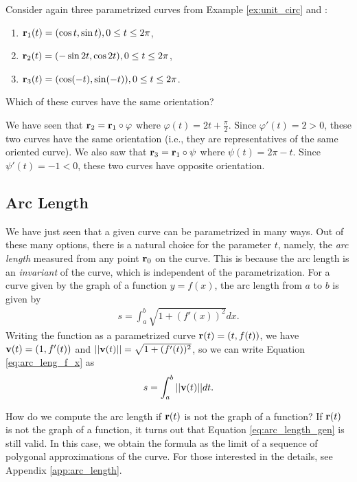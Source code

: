 \documentclass[12pt,letterpaper,reqno]{article}
\numberwithin{equation}{section}
\newcommand{\bv}{{\bf v}}
\newcommand{\bbr}{{\bf r}}
\begin{document}
{\begin{exercise}
Consider again three parametrized curves from Example \ref{ex:unit_circ} and :
\begin{enumerate}[(1)]
	\item $\bbr_1(t)=(\cos t, \sin t), 0 \leq t \leq 2\pi$, 
	\item $\bbr_2(t)=(-\sin 2t, \cos 2t), 0 \leq t \leq 2\pi$,
	\item $\bbr_3(t)=(\cos(-t), \sin(-t)), 0 \leq t \leq 2\pi$.
\end{enumerate}	
Which of these curves have the same orientation?
\end{exercise}

{\color{red}
\begin{solution}
	We have seen that $\bbr_2=\bbr_1 \circ \varphi$ where $\varphi(t)=2t+\frac{\pi}{2}$. Since $\varphi'(t)=2>0$, these two curves have the same orientation (i.e., they are representatives of the same oriented curve). We also saw that $\bbr_3=\bbr_1 \circ \psi$ where $\psi(t)=2\pi-t$. Since $\psi'(t)=-1<0$, these two curves have opposite orientation.
\end{solution}
}

\subsection{Arc Length}
We have just seen that a given curve can be parametrized in many ways. Out of these many options, there is a natural choice for the parameter $t$, namely, the \emph{arc length} measured from any point $\bbr_0$ on the curve. This is because the arc length is an \emph{invariant} of the curve, which is independent of the parametrization. For a curve given by the graph of a function $y=f(x)$, the arc length from $a$ to $b$ is given by
\begin{align}\label{eq:arc_leng_f_x}
	s=\int_a^b\sqrt{1+(f'(x))^2}dx.
\end{align}
Writing the function as a parametrized curve $\bbr(t)=(t,f(t))$, we have $\bv(t)=(1,f'(t))$ and $||\bv(t)||=\sqrt{1+(f'(t))^2}$, so we can write Equation \eqref{eq:arc_leng_f_x} as
\begin{align}\label{eq:arc_length_gen}
	s=\int_a^b||\bv(t)||dt.
\end{align}

How do we compute the arc length if $\bbr(t)$ is not the graph of a function?  If $\bbr(t)$ is not the graph of a function, it turns out that Equation \eqref{eq:arc_length_gen} is still valid.  In this case, we obtain the formula as the limit of a sequence of polygonal approximations of the curve. For those interested in the details, see Appendix \ref{app:arc_length}. 

}
\end{document}
